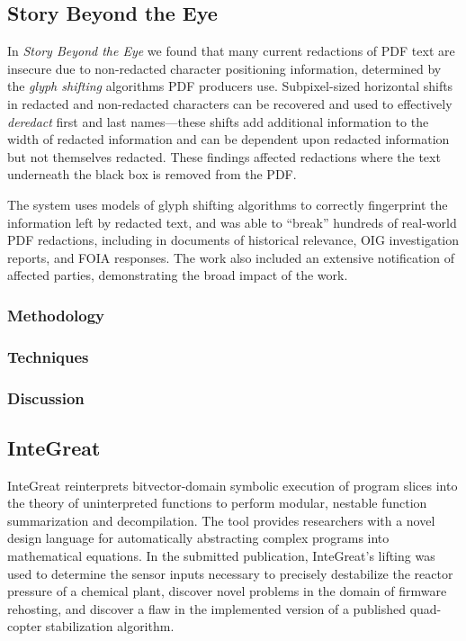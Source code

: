 \subsection{Story Beyond the Eye}

In \emph{Story Beyond the Eye} we found that many current redactions of PDF text are insecure due to non-redacted character positioning information, determined by the \emph{glyph shifting} algorithms PDF producers use.
Subpixel-sized horizontal shifts in redacted and non-redacted characters can be recovered and used to effectively \emph{deredact} first and last names---these shifts add additional information to the width of redacted information and can be dependent upon redacted information but not themselves redacted.
These findings affected redactions where the text underneath the black box is removed from the PDF.

The system uses models of glyph shifting algorithms to correctly fingerprint the information left by redacted text, and was able to ``break'' hundreds of real-world PDF redactions, including in documents of historical relevance, OIG investigation reports, and FOIA responses.
The work also included an extensive notification of affected parties, demonstrating the broad impact of the work.

\subsubsection{Methodology}
\subsubsection{Techniques}
\subsubsection{Discussion}

\subsection{InteGreat}

InteGreat reinterprets bitvector-domain symbolic execution of program slices into the theory of uninterpreted functions to perform modular, nestable function summarization and decompilation.
The tool provides researchers with a novel design language for automatically abstracting complex programs into mathematical equations.
In the submitted publication, InteGreat's lifting was used to determine the sensor inputs necessary to precisely destabilize the reactor pressure of a chemical plant, discover novel problems in the domain of firmware rehosting, and discover a flaw in the implemented version of a published quad-copter stabilization algorithm.

